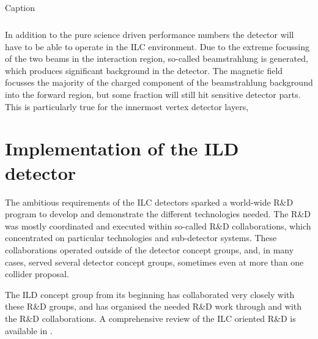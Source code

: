 \documentclass[%
 amsmath,amssymb,
 aps,
]{revtex4-1}
\newcommand{\bottomrule}{\hline}
\begin{document}
\begin{table}[]
\begin{tabular}{|l|l|c|c|p{4cm}|}
        
\bottomrule
    \end{tabular}
    \caption{Caption}
    \label{tab:my_label}
\end{table}


In addition to the pure science driven performance numbers the detector will have to be able to operate in the ILC environment. Due to the extreme focussing of the two beams in the interaction region, so-called beamstrahlung is generated, which produces significant background in the detector. The magnetic field focusses the majority of the charged component of the beamstrahlung background into the forward region, but some fraction will still hit sensitive detector parts. This is particularly true for the innermost vertex detector layers, 


\section{Implementation of the ILD detector}
The ambitious requirements of the ILC detectors sparked a world-wide R\&D program to develop and demonstrate the different technologies needed. The R\&D was mostly coordinated and executed within so-called R\&D collaborations, which concentrated on particular technologies and sub-detector systems. These collaborations operated outside of the detector concept groups, and, in many cases, served several detector concept groups, sometimes even at more than one collider proposal. 

The ILD concept group from its beginning has collaborated very closely with these R\&D groups, and has organised the needed R\&D work through and with the R\&D collaborations. A comprehensive review of the ILC oriented R\&D is available in \cite{RDliaision}.
\end{document}
